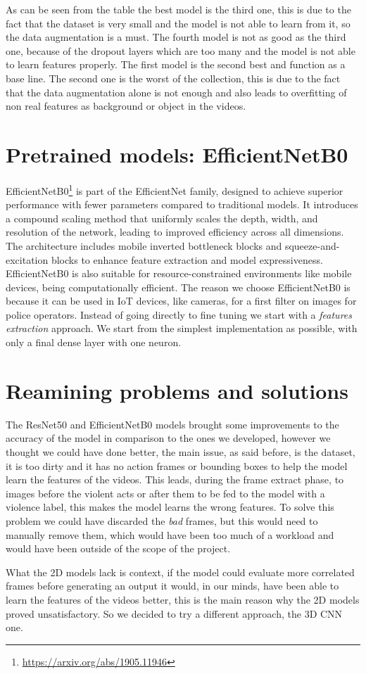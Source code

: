 As can be seen from the table the best model is the third one, this is due to the fact that the dataset is very small and the model is not able to learn from it, so the data augmentation is a must. The fourth model is not as good as the third one, because of the dropout layers which are too many and the model is not able to learn features properly. The first model is the second best and function as a base line. The second one is the worst of the collection, this is due to the fact that the data augmentation alone is not enough and also leads to overfitting of non real features as background or object in the videos.

\section{Pretrained models: EfficientNetB0}
EfficientNetB0\footnote{\url{https://arxiv.org/abs/1905.11946}} is part of the EfficientNet family, designed to achieve superior performance with fewer parameters compared to traditional models.
It introduces a compound scaling method that uniformly scales the depth, width, and resolution of the network, leading to improved efficiency across all dimensions.
The architecture includes mobile inverted bottleneck blocks and squeeze-and-excitation blocks to enhance feature extraction and model expressiveness.
EfficientNetB0 is also suitable for resource-constrained environments like mobile devices, being computationally efficient. 
The reason we choose EfficientNetB0 is because it can be used in IoT devices, like cameras, for a first filter on images for police operators.
Instead of going directly to fine tuning we start with a \textit{features extraction} approach.
We start from the simplest implementation as possible, with only a final dense layer with one neuron. 

 
\section{Reamining problems and solutions} 
The ResNet50 and EfficientNetB0 models brought some improvements to the accuracy of the model in comparison to the ones we developed, however we thought we could have done better, the main issue, as said before, is the dataset, it is too dirty and it has no action frames or bounding boxes to help the model learn the features of the videos. This leads, during the frame extract phase, to images before the violent acts or after them to be fed to the model with a violence label, this makes the model learns the wrong features. To solve this problem we could have discarded the \textit{bad} frames, but this would need to manually remove them, which would have been too much of a workload and would have been outside of the scope of the project.

    What the 2D models lack is context, if the model could evaluate more correlated frames before generating an output it would, in our minds, have been able to learn the features of the videos better, this is the main reason why the 2D models proved unsatisfactory. So we decided to try a different approach, the 3D CNN one.